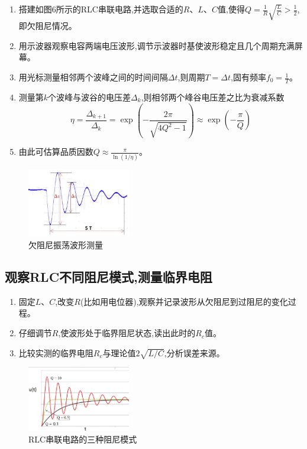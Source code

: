 \documentclass[UTF8]{ctexart}
\begin{document}
\begin{enumerate}
\item 搭建如图6所示的RLC串联电路,并选取合适的$R$、$L$、$C$值,使得$Q=\frac{1}{R}\sqrt{\frac{L}{C}}>\frac{1}{2}$,即欠阻尼情况。
\item 用示波器观察电容两端电压波形,调节示波器时基使波形稳定且几个周期充满屏幕。
\item 用光标测量相邻两个波峰之间的时间间隔$\Delta t$,则周期$T=\Delta t$,固有频率$f_0=\frac{1}{T}$。
\item 测量第$k$个波峰与波谷的电压差$\Delta_k$,则相邻两个峰谷电压差之比为衰减系数
\begin{equation}
\eta=\frac{\Delta_{k+1}}{\Delta_k}=\exp\left(-\frac{2\pi}{\sqrt{4Q^2-1}}\right)\approx\exp\left(-\frac{\pi}{Q}\right)
\end{equation}
\item 由此可估算品质因数$Q\approx\frac{\pi}{\ln(1/\eta)}$。
\end{enumerate}

\begin{figure}[htbp]
\centering
\includegraphics[width=0.4\textwidth]{RLC_oscillation}
\caption{欠阻尼振荡波形测量}
\end{figure}

\subsection{观察RLC不同阻尼模式,测量临界电阻}

\begin{enumerate}
\item 固定$L$、$C$,改变$R$(比如用电位器),观察并记录波形从欠阻尼到过阻尼的变化过程。
\item 仔细调节$R$,使波形处于临界阻尼状态,读出此时的$R_c$值。
\item 比较实测的临界电阻$R_c$与理论值$2\sqrt{L/C}$,分析误差来源。
\end{enumerate}

\begin{figure}[htbp]
\centering
\includegraphics[width=0.4\textwidth]{RLC_damping.png}
\caption{RLC串联电路的三种阻尼模式}
\end{figure}
\newpage
\end{document}
